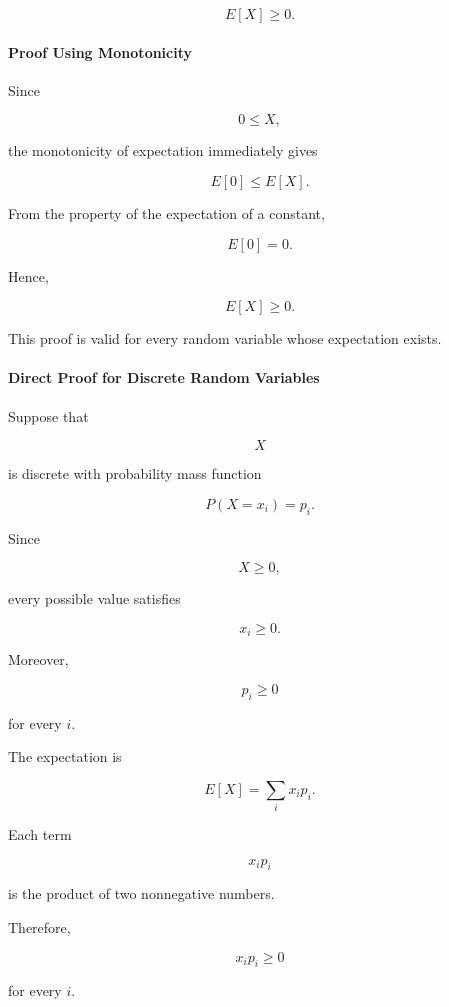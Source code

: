 \documentclass[11pt]{article}
\begin{document}
\begin{mdframed}[
		linewidth=0.8pt,
		roundcorner=6pt,
		backgroundcolor=gray!5,
		linecolor=gray!60,
		innertopmargin=10pt,
		innerbottommargin=10pt,
		innerleftmargin=10pt,
		innerrightmargin=10pt
		]
		\[
		E[X]\ge0.
		\]
		
		\bigskip
		
		\paragraph{Proof Using Monotonicity}
		
		Since
		
		\[
		0\le X,
		\]
		
		the monotonicity of expectation immediately gives
		
		\[
		E[0]
		\le
		E[X].
		\]
		
		From the property of the expectation of a constant,
		
		\[
		E[0]=0.
		\]
		
		Hence,
		
		\[
		\boxed{
			E[X]\ge0.
		}
		\]
		
		This proof is valid for every random variable whose expectation exists.
		
		\bigskip
		
		\paragraph{Direct Proof for Discrete Random Variables}
		
		Suppose that
		
		\[
		X
		\]
		
		is discrete with probability mass function
		
		\[
		P(X=x_i)=p_i.
		\]
		
		Since
		
		\[
		X\ge0,
		\]
		
		every possible value satisfies
		
		\[
		x_i\ge0.
		\]
		
		Moreover,
		
		\[
		p_i\ge0
		\]
		
		for every \(i\).
		
		The expectation is
		
		\[
		E[X]
		=
		\sum_i
		x_ip_i.
		\]
		
		Each term
		
		\[
		x_ip_i
		\]
		
		is the product of two nonnegative numbers.
		
		Therefore,
		
		\[
		x_ip_i\ge0
		\]
		
		for every \(i\).
		

\end{mdframed}
\end{document}
